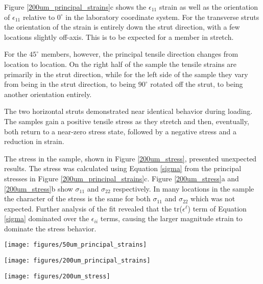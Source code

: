 Figure \ref{200um_principal_strains}c shows the $\epsilon_{11}$ strain as well as the orientation of $\epsilon_{11}$ relative to $0^\circ$ in the laboratory coordinate system. For the transverse struts the orientation of the strain is entirely down the strut direction, with a few locations slightly off-axis. This is to be expected for a member in stretch. 

For the $45^\circ$ members, however, the principal tensile direction changes from location to location. On the right half of the sample the tensile strains are primarily in the strut direction, while for the left side of the sample they vary from being in the strut direction, to being $90^\circ$ rotated off the strut, to being another orientation entirely.


The two horizontal struts demonstrated near identical behavior during loading. The samples gain a positive tensile stress as they stretch and then, eventually, both return to a near-zero stress state, followed by a negative stress and a reduction in strain.

The stress in the sample, shown in Figure \ref{200um_stress}, presented unexpected results. The stress was calculated using Equation \ref{sigma} from the principal stresses in Figure \ref{200um_principal_strains}c. Figure \ref{200um_stress}a and \ref{200um_stress}b show $\sigma_{11}$ and $\sigma_{22}$ respectively. In many locations in the sample the character of the stress is the same for both $\sigma_{11}$ and $\sigma_{22}$ which was not expected. Further analysis of the fit revealed that the tr($\epsilon^\ell$) term of Equation \ref{sigma} dominated over the $\epsilon_{ii}$ terms, causing the larger magnitude strain to dominate the stress behavior. 


\begin{figure*}
	\texttt{[image: figures/50um\_principal\_strains]}
	\caption{The principal strains and orientation of the principal coordinate system at a macroscopic displacement of 50um on the sample.}
	\label{50um_principal_strains}
\end{figure*}

\begin{figure*}
	\texttt{[image: figures/200um\_principal\_strains]}
	\caption{The principal strains and orientation of the principal coordinate system at a macroscopic displacement of 200um on the sample.}
	\label{200um_principal_strains}
\end{figure*}

\begin{figure*}
	\texttt{[image: figures/200um\_stress]}
	\caption{Principal stress in the sample with a) showing the $\sigma_{11}$ stress and b) showing the $\sigma_{22}$ stress.}
	\label{200um_stress}
\end{figure*}


